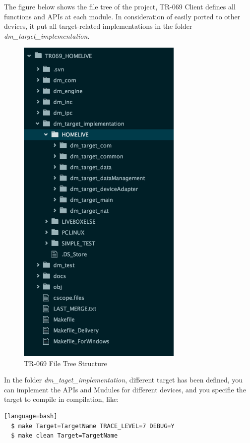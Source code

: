 The figure below shows the file tree of the project, TR-069 Client defines all functions and APIs at each module. In consideration of easily ported to other devices, it put all target-related implementations in the folder \textit{dm\_target\_implementation}.

\begin{figure}[htbp]
	\centering
		\includegraphics[width=8cm]{Figures/tr069_files.png}
	\caption[TR-069 File Tree Structure]{TR-069 File Tree Structure}
	\label{fig:tr069file}
\end{figure}

In the folder \textit{dm_taget_implementation}, different target has been defined, you can implement the APIs and Mudules for different devices, and you specifie the target to compile in compilation, like:

\begin{lstlisting}[style=DOS][language=bash]
  $ make Target=TargetName TRACE_LEVEL=7 DEBUG=Y
  $ make clean Target=TargetName
\end{lstlisting}

